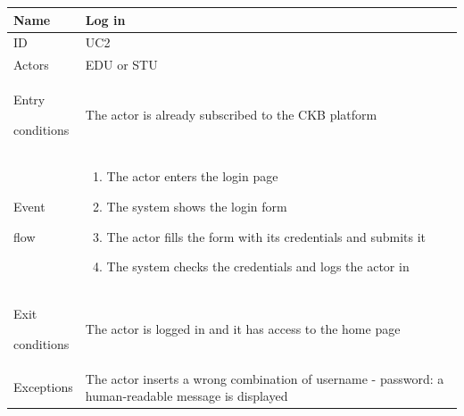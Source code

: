 \begin{center}
    \def\arraystretch{1.5}
    \begin{tabular}{| m{2cm} | m{10cm}|}
        \hline
        Name                  & Log in                                                                                              \\ \hline
        ID                    & UC2                                                                                                 \\ \hline
        Actors                & EDU or STU                                                                                          \\ \hline
        Entry \par conditions & The actor is already subscribed to the CKB platform                                                 \\ \hline
        Event \par flow       & \begin{enumerate}
                                    \item The actor enters the login page
                                    \item The system shows the login form
                                    \item The actor fills the form with its credentials and submits it
                                    \item The system checks the credentials and logs the actor in
                                \end{enumerate}                                   \\ \hline
        Exit \par conditions  & The actor is logged in and it has access to the home page                                           \\ \hline
        Exceptions            & The actor inserts a wrong combination of username - password: a human-readable message is displayed \\ \hline
    \end{tabular}
\end{center}

